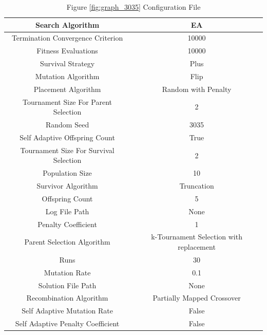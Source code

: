 \documentclass{standalone}
\begin{document}
\begin{table}[!htb]
	\centering
	\caption{Figure \ref{fig:graph_3035} Configuration File}
	\label{tab:graph_3035}
	\begin{tabular}{| c | c |}
		\hline
		Search Algorithm		& EA		 \\
		\hline
		Termination Convergence Criterion		& 10000		 \\
		\hline
		Fitness Evaluations		& 10000		 \\
		\hline
		Survival Strategy		& Plus		 \\
		\hline
		Mutation Algorithm		& Flip		 \\
		\hline
		Placement Algorithm		& Random with Penalty		 \\
		\hline
		Tournament Size For Parent Selection		& 2		 \\
		\hline
		Random Seed		& 3035		 \\
		\hline
		Self Adaptive Offspring Count		& True		 \\
		\hline
		Tournament Size For Survival Selection		& 2		 \\
		\hline
		Population Size		& 10		 \\
		\hline
		Survivor Algorithm		& Truncation		 \\
		\hline
		Offspring Count		& 5		 \\
		\hline
		Log File Path		& None		 \\
		\hline
		Penalty Coefficient		& 1		 \\
		\hline
		Parent Selection Algorithm		& k-Tournament Selection with replacement		 \\
		\hline
		Runs		& 30		 \\
		\hline
		Mutation Rate		& 0.1		 \\
		\hline
		Solution File Path		& None		 \\
		\hline
		Recombination Algorithm		& Partially Mapped Crossover		 \\
		\hline
		Self Adaptive Mutation Rate		& False		 \\
		\hline
		Self Adaptive Penalty Coefficient		& False		 \\
		\hline
	\end{tabular}
\end{table}
\end{document}
